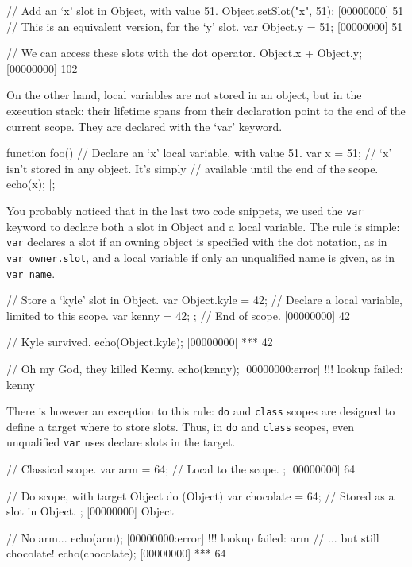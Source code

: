 \begin{urbiscript}
// Add an `x' slot in Object, with value 51.
Object.setSlot("x", 51);
[00000000] 51
// This is an equivalent version, for the `y' slot.
var Object.y = 51;
[00000000] 51

// We can access these slots with the dot operator.
Object.x + Object.y;
[00000000] 102
\end{urbiscript}

On the other hand, local variables are not stored in an object, but in
the execution stack: their lifetime spans from their declaration point
to the end of the current scope. They are declared with the `var'
keyword.

\begin{urbiscript}
function foo()
{
  // Declare an `x' local variable, with value 51.
  var x = 51;
  // `x' isn't stored in any object. It's simply
  // available until the end of the scope.
  echo(x);
}|;
\end{urbiscript}

You probably noticed that in the last two code snippets, we used the
\lstinline|var| keyword to declare both a slot in Object and a local
variable. The rule is simple: \lstinline|var| declares a slot if an owning
object is specified with the dot notation, as in %
\lstinline|var owner.slot|, and a local variable if only an unqualified name
is given, as in \lstinline|var name|.

\begin{urbiscript}
{
  // Store a `kyle' slot in Object.
  var Object.kyle = 42;
  // Declare a local variable, limited to this scope.
  var kenny = 42;
}; // End of scope.
[00000000] 42

// Kyle survived.
echo(Object.kyle);
[00000000] *** 42

// Oh my God, they killed Kenny.
echo(kenny);
[00000000:error] !!! lookup failed: kenny
\end{urbiscript}

There is however an exception to this rule: \lstinline|do| and
\lstinline|class| scopes are designed to define a target where to
store slots. Thus, in \lstinline|do| and \lstinline|class| scopes,
even unqualified \lstinline|var| uses declare slots in the target.

\begin{urbiscript}
// Classical scope.
{
  var arm = 64; // Local to the scope.
};
[00000000] 64

// Do scope, with target Object
do (Object)
{
  var chocolate = 64; // Stored as a slot in Object.
};
[00000000] Object

// No arm...
echo(arm);
[00000000:error] !!! lookup failed: arm
// ... but still chocolate!
echo(chocolate);
[00000000] *** 64
\end{urbiscript}

